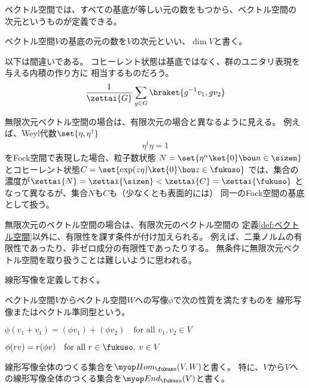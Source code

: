 	ベクトル空間では、すべての基底が等しい元の数をもつから、ベクトル空間の
	次元というものが定義できる。

	\begin{definition}[ベクトル空間の次元]\label{def:ベクトル空間の次元} %
		ベクトル空間$V$の基底の元の数を$V$の次元といい、$\dim V$と書く。
	\end{definition} %

	\begin{note}[無限次元ベクトル空間]\label{note:無限次元ベクトル空間} %
		以下は間違いである。
		コヒーレント状態は基底ではなく、群のユニタリ表現を与える内積の作り方に
		相当するものだろう。
		\begin{equation*}\begin{split} %
			\frac{1}{\zettai{G}}\sum_{g\in G}\braket{g^{-1}v_1,gv_2}
		\end{split}\end{equation*} %

		無限次元ベクトル空間の場合は、有限次元の場合と異なるように見える。
		例えば、Weyl代数$\set{\eta,\eta^\dag}$
		\begin{equation*}\begin{split} %
			\eta^\dag\eta = 1
		\end{split}\end{equation*} %
		をFock空間で表現した場合、粒子数状態
		$N=\set{\eta^n\ket{0}\bou n\in\sizen}$
		とコヒーレント状態$C=\set{\exp(z\eta)\ket{0}\bou z\in\fukuso}$
		では、集合の濃度が$\zettai{N}=\zettai{\sizen}<\zettai{C}=\zettai{\fukuso}$
		となって異なるが、集合$N$も$C$も（少なくとも表面的には）
		同一のFock空間の基底として扱う。

		無限次元のベクトル空間の場合は、有限次元のベクトル空間の
		定義\ref{def:ベクトル空間}以外に、有限性を課す条件が付け加えられる。
		例えば、二乗ノルムの有限性であったり、非ゼロ成分の有限性であったりする。
		無条件に無限次元ベクトル空間を取り扱うことは難しいように思われる。
	\end{note} %

	線形写像を定義しておく。

	\begin{definition}[線形写像]\label{def:線形写像} %
		ベクトル空間$V$からベクトル空間$W$への写像$\phi$で次の性質を満たすものを
		線形写像またはベクトル準同型という。
		\begin{description}\setlength{\itemsep}{-1mm} %
			\item[加法] $
			\phi(v_1 + v_1) = (\phi v_1) + (\phi v_2)
			\quad\text{for all }v_1,v_2\in V
			$
			\item[係数] $
			\phi(rv) = r(\phi v) \quad\text{for all }r\in\fukuso,\;v\in V
			$
		\end{description} %
		線形写像全体のつくる集合を$\Hom_\fukuso(V,W)$と書く。
		特に、$V$から$V$への線形写像全体のつくる集合を$\End_\fukuso(V)$と書く。
	\end{definition} %

